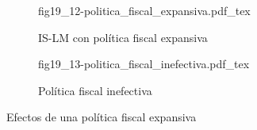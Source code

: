 \begin{figure}[h]
\captionsetup[subfigure]{aboveskip=20pt,belowskip=15pt}
\centering
\begin{subfigure}{.45\textwidth}
  \centering
        \def\svgwidth{\textwidth}
        {fig19_12-politica_fiscal_expansiva.pdf_tex}
  \caption{IS-LM con política fiscal expansiva}
  \label{fig19_12-politica_fiscal_expansiva}
\end{subfigure}\hspace{.05\textwidth}
\begin{subfigure}{.45\textwidth}
  \centering
        \def\svgwidth{\textwidth}
        {fig19_13-politica_fiscal_inefectiva.pdf_tex}
  \caption{Política fiscal inefectiva}
  \label{fig19_13-politica_fiscal_inefectiva}
\end{subfigure}
\caption{Efectos de una política fiscal expansiva}
\label{fig19_10-politica_fiscal}
\end{figure}